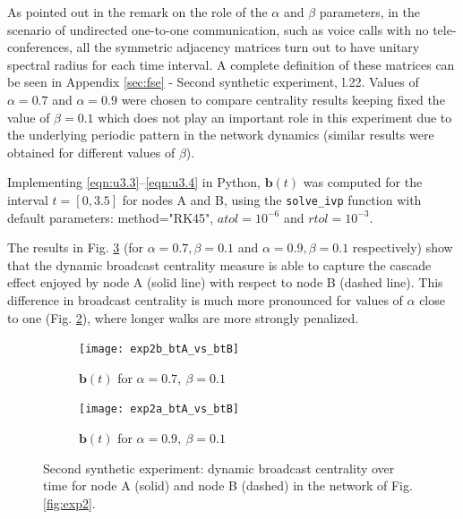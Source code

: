 As pointed out in the remark on the role of the $\alpha$ and $\beta$ parameters, in the scenario of undirected one-to-one communication, such as voice calls with no tele-conferences, all the symmetric adjacency matrices turn out to have unitary spectral radius for each time interval. A complete definition of these matrices can be seen in Appendix \ref{sec:fse} - Second synthetic experiment, l.22. Values of $\alpha=0.7$ and $\alpha=0.9$ were chosen to compare centrality results keeping fixed the value of $\beta=0.1$ which does not play an important role in this experiment due to the underlying periodic pattern in the network dynamics (similar results were obtained for different values of $\beta$). 

Implementing \eqref{eqn:u3.3}--\eqref{eqn:u3.4} in Python, $\mathbf{b}(t)$ was computed for the interval $t=[0,3.5]$ for nodes A and B, using the \texttt{solve\_ivp} function with default parameters: method="RK45", $atol=10^{-6}$ and $rtol=10^{-3}$.

The results in Fig. \ref{fig:twobt} (for $\alpha = 0.7, \beta = 0.1$ and $\alpha = 0.9 , \beta = 0.1$ respectively) show that the dynamic broadcast centrality measure is able to capture the cascade effect enjoyed by node A (solid line) with respect to node B (dashed line). This difference in broadcast centrality is much more pronounced for values of $\alpha$ close to one (Fig. \ref{fig:bt6}), where longer walks are more strongly penalized. 

\begin{figure}
     \centering
     \begin{subfigure}[b]{0.49\textwidth}
         \centering
         \texttt{[image: exp2b\_btA\_vs\_btB]}
         \caption{$\mathbf{b}(t)$ for $\alpha = 0.7 ,~\beta = 0.1$}
         \label{fig:bt5}
     \end{subfigure}
     \hfill
     \begin{subfigure}[b]{0.49\textwidth}
         \centering
         \texttt{[image: exp2a\_btA\_vs\_btB]}
         \caption{$\mathbf{b}(t)$ for $\alpha = 0.9 ,~\beta = 0.1$}
         \label{fig:bt6}
     \end{subfigure}
     \caption{Second synthetic experiment: dynamic broadcast centrality over time for node A (solid) and node B (dashed) in the network of Fig. \ref{fig:exp2}.}
     \label{fig:twobt}
\end{figure}

